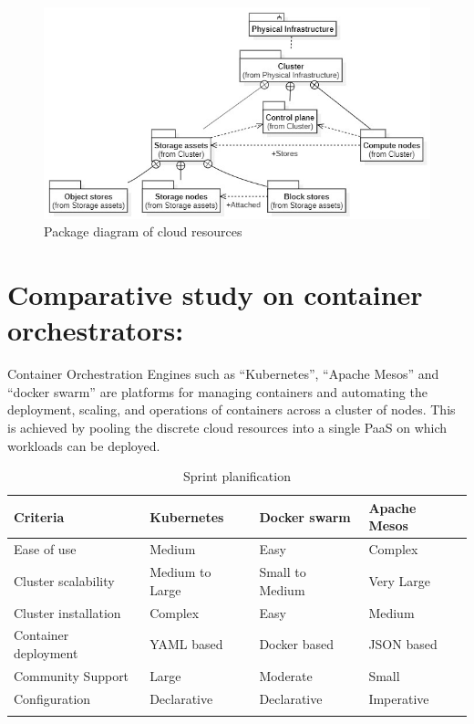 \begin{figure}[H]\centering
\includegraphics[width=1.0\textwidth,angle=00]{assets/f11.jpg}
\caption{Package diagram of cloud resources }
\label{fig:Package diagram of cloud resources }
\end{figure}

\section{Comparative study on container orchestrators: }

Container Orchestration Engines such as “Kubernetes”, “Apache Mesos” and “docker swarm” are platforms for managing containers and automating the deployment, scaling, and operations of containers across a cluster of nodes. This is achieved by pooling the discrete cloud resources into a single PaaS on which workloads can be deployed. 

\begin{longtable}[H]{|m{3.5cm}|m{3.5cm}|m{3.5cm}|m{3.5cm}|}
\hline
Criteria & Kubernetes & Docker swarm & Apache Mesos  \\
\hline
Ease of use & Medium & Easy & Complex  \\
\hline
Cluster scalability & Medium to Large & Small to Medium & Very Large  \\
\hline
Cluster installation & Complex & Easy & Medium  \\
\hline
Container deployment & YAML based  & Docker based & JSON based \\
\hline
Community Support  & Large  & Moderate  & Small \\
\hline
Configuration & Declarative  & Declarative & Imperative \\
\hline
\caption{Sprint planification}
\end{longtable}

